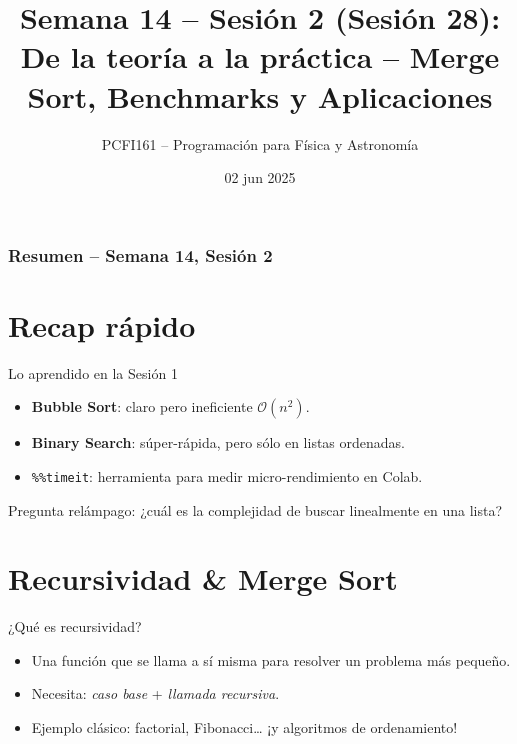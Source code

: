 \documentclass[10pt]{beamer}
\title{Semana 14 – Sesión 2 (Sesión 28):\\
De la teoría a la práctica – Merge Sort, Benchmarks y Aplicaciones}
\author{PCFI161 – Programación para Física y Astronomía}
\date{02 jun 2025}
\begin{document}
\myfront{}
\begin{frame}\titlepage\end{frame}

\begin{frame}
  \frametitle{Resumen -- Semana 14, Sesión 2}
  \tableofcontents
\end{frame}


\section{Recap rápido}
\begin{frame}{Lo aprendido en la Sesión 1}
\begin{itemize}
  \item \textbf{Bubble Sort}: claro pero ineficiente \(\mathcal{O}(n^{2})\).
  \item \textbf{Binary Search}: súper-rápida, pero sólo en listas ordenadas.
  \item \texttt{\%\%timeit}: herramienta para medir micro-rendimiento en Colab.
\end{itemize}
\alert{Pregunta relámpago}: ¿cuál es la complejidad de buscar linealmente en una lista?
\end{frame}

\section{Recursividad \& Merge Sort}
\begin{frame}[fragile]{¿Qué es recursividad?}
\begin{itemize}
  \item Una función que se llama a sí misma para resolver un problema más pequeño.
  \item Necesita: \textit{caso base} + \textit{llamada recursiva}.
  \item Ejemplo clásico: factorial, Fibonacci… ¡y algoritmos de ordenamiento!
\end{itemize}
\end{frame}
\end{document}
